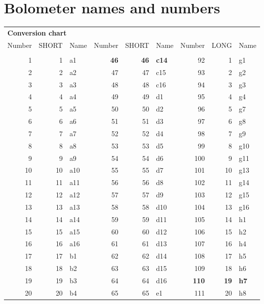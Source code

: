 \documentclass[twoside,11pt]{article}
\newcommand{\xlabel}[1]{}
\begin{document}
{\begin{description}
\end{description}

\newpage
\appendix
\section{\xlabel{bolnames}Bolometer names and numbers\label{bolnames}}

{\small
\begin{flushleft}
\begin{tabular}{rrlrrlrrl}
\hline
\multicolumn{9}{l}{\bf Conversion chart}\\
Number & SHORT & Name &  Number & SHORT & Name & Number & LONG & Name \\
\hline \\
 1  &  1 & a1 & {\bf 46}  & {\bf 46} & {\bf c14} & 92 &  1 & g1 \\
 2  &  2 & a2 & 47 & 47 & c15 & 93 & 2 & g2 \\
 3  &  3 & a3 & 48 & 48 & c16 & 94 & 3 & g3 \\
 4  &  4 & a4 & 49 & 49 & d1 & 95 & 4 & g4 \\
 5  &  5 & a5 & 50 & 50 & d2 & 96 & 5 & g7 \\
 6  &  6 & a6 & 51 & 51 & d3 & 97 & 6 & g8 \\
 7  &  7 & a7 & 52 & 52 & d4 & 98 & 7 & g9 \\
 8  &  8 & a8 & 53 & 53 & d5 & 99 & 8 & g10 \\
 9  &  9 & a9 & 54 & 54 & d6 & 100 & 9 & g11 \\
10  & 10 & a10 & 55 & 55 & d7 & 101 & 10 & g13 \\
11  & 11 & a11 & 56 & 56 & d8 & 102 & 11 & g14 \\
12  & 12 & a12 & 57 & 57 & d9 & 103 & 12 & g15 \\
13  & 13 & a13 & 58 & 58 & d10 & 104 & 13 & g16 \\
14  & 14 & a14 & 59 & 59 & d11 & 105 & 14 & h1 \\
15  & 15 & a15 & 60 & 60 & d12 & 106 & 15 & h2 \\
16  & 16 & a16 & 61 & 61 & d13 & 107 & 16 & h4 \\
17  & 17 & b1 & 62 & 62 & d14 & 108 & 17 & h5  \\
18  & 18 & b2 & 63 & 63 & d15 & 109 & 18 & h6  \\
19  & 19 & b3 & 64 & 64 & d16 & {\bf 110} & {\bf 19} & {\bf h7} \\
20  & 20 & b4 & 65 & 65 & e1 & 111 & 20 & h8 \\

\end{tabular}
\end{flushleft}}}
\end{document}
